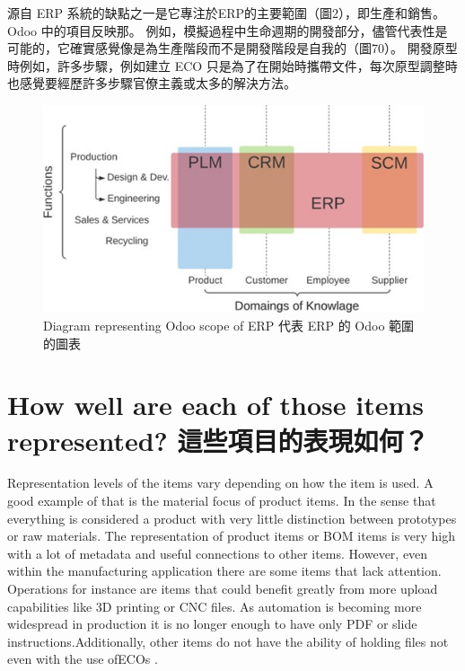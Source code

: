 \fontsize{12pt}{2.5pt}\selectfont
{源自 ERP 系統的缺點之一是它專注於ERP的主要範圍（圖2），即生產和銷售。 Odoo 中的項目反映那。 例如，模擬過程中生命週期的開發部分，儘管代表性是可能的，它確實感覺像是為生產階段而不是開發階段是自我的（圖70）。 開發原型時例如，許多步驟，例如建立 ECO 只是為了在開始時攜帶文件，每次原型調整時也感覺要經歷許多步驟官僚主義或太多的解決方法。}\\[1pt]

\begin{figure}[hbt!]
\begin{center}
\includegraphics[width=15cm]{70}
\caption{\Large  Diagram representing Odoo scope of ERP 代表 ERP 的 Odoo 範圍的圖表}\label{fig.70}
\end{center}
\end{figure}

\section{How well are each of those items represented? 這些項目的表現如何？}
\fontsize{12pt}{2.5pt}\selectfont 
{Representation levels of the items vary depending on how the item is used. A good example of that is the material focus of product items. In the sense that everything is considered a product with very little distinction between prototypes or raw materials. The
representation of product items or BOM items is very high with a lot of metadata and useful connections to other items. However, even within the manufacturing application there are some items that lack attention. Operations for instance are items that could benefit greatly from more upload capabilities like 3D printing or CNC files. As automation is becoming more widespread in production it is no longer enough to have only PDF or slide instructions.Additionally, other items do not have the ability of holding files not even with the use ofECOs .}\\[1pt]

